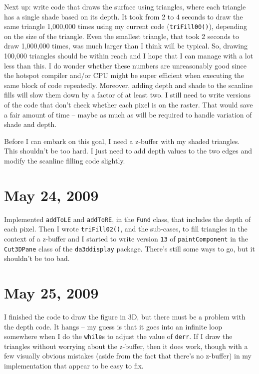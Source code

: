 \documentclass[titlepage,oneside,10pt]{article}
\begin{document}
Next up: write code that draws the surface using triangles, where each
triangle has a single shade based on its depth. It took from 2 to 4
seconds to draw the same triangle 1,000,000 times using my current
code ({\tt triFill00()}), depending on the
size of the triangle. Even the smallest triangle, that took 2 seconds
to draw 1,000,000 times, was much
larger than I think will be typical. So, drawing 100,000 triangles
should be within reach and I hope that I can manage with a lot less than
this. I do wonder whether these numbers are unreasonably good since
the hotspot compiler and/or CPU might be super efficient when
executing the same block of code repeatedly. Moreover, adding depth
and shade to the scanline fills will slow them down by a factor of at
least two. I still need to write versions of the code that don't check
whether each pixel is on the raster. That would save a fair amount of
time -- maybe as much as will be required to handle variation of shade
and depth.

Before I can embark on this goal, I need a z-buffer with my shaded
triangles. This shouldn't be too hard. I just need to add depth values
to the two edges and modify the scanline filling code slightly.

\section{May 24, 2009}

Implemented {\tt addToLE} and {\tt addToRE}, in the {\tt Fund} class,
that includes the depth of each pixel. Then I wrote {\tt triFill02()},
and the sub-cases, to fill triangles in the context of a z-buffer and
I started to write version {\tt 13} of {\tt paintComponent} in the
{\tt Cut3DPane} class of the {\tt da3ddisplay} package. There's still
some ways to go, but it shouldn't be too bad.

\section{May 25, 2009}

I finished the code to draw the figure in 3D, but there must be a
problem with the depth code. It hangs -- my guess is that it goes into
an infinite loop somewhere when I do the {\tt while}s to adjust the
value of {\tt derr}. If I draw the triangles without
worrying about the z-buffer, then it does work, though with a few
visually obvious mistakes (aside from the fact that there's no
z-buffer) in my implementation that appear to be easy to fix.
\end{document}
